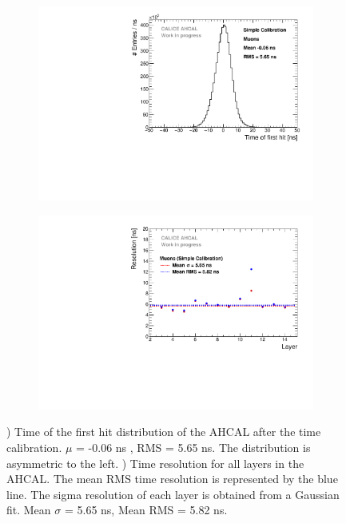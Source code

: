 \begin{figure}[htbp!]
	\begin{subfigure}[t]{0.49\textwidth}
		\centering
		\includegraphics[width=1\textwidth]{../Thesis_Plots/Timing/Muons/Plots/Timing_AHCAL_noCorrections.pdf}
		\caption{}\label{fig:timing_nocorrection}
	\end{subfigure}
	\hfill
	\begin{subfigure}[t]{0.49\textwidth}
		\centering
		\includegraphics[width=1\textwidth]{../Thesis_Plots/Timing/Muons/Plots/ResolutionPerModule_noCorrections.pdf}
		\caption{}\label{fig:reso_nocorrection}
	\end{subfigure}
	\caption{) Time of the first hit distribution of the AHCAL after the time calibration. $\mu$ = -0.06 ns , RMS = 5.65 ns. The distribution is asymmetric to the left. ) Time resolution for all layers in the AHCAL. The mean RMS time resolution is represented by the blue line. The sigma resolution of each layer is obtained from a Gaussian fit. Mean $\sigma$ = 5.65 ns, Mean RMS = 5.82 ns.}
\end{figure}

